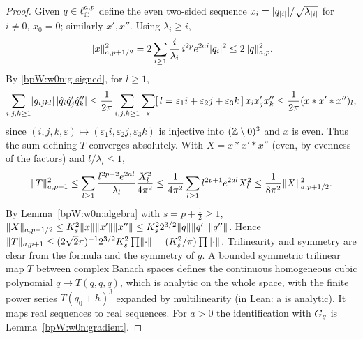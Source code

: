 \begin{proof}
\label{stepW:w0n:majorant}
Given $q\in\ell^{a,p}_{\mathbb{C}}$ define the even two-sided sequence $x_i=\lvert q_{\lvert i\rvert}\rvert/\sqrt{\lambda_{\lvert i\rvert}}$ for
$i\neq0$, $x_0=0$; similarly $x',x''$. Using $\lambda_i\ge i$,
\[\lVert x\rVert_{a,p+1/2}^2=2\sum_{i\ge1}\frac{i}{\lambda_i}\,i^{2p}e^{2ai}\lvert q_i\rvert^2\le2\lVert q\rVert_{a,p}^2.\]
\label{stepW:w0n:selection}
By \eqref{bpW:w0n:g-signed}, for $l\ge1$,
\[\sum_{i,j,k\ge1}\lvert g_{ijkl}\rvert\,\lvert \hat q_i\hat q'_j\hat q''_k\rvert\le\frac1{2\pi}\sum_{i,j,k\ge1}\sum_{\varepsilon}
[\,l=\varepsilon_1i+\varepsilon_2j+\varepsilon_3k\,]\,x_ix'_jx''_k\le\frac{1}{2\pi}(x*x'*x'')_l,\]
since $(i,j,k,\varepsilon)\mapsto(\varepsilon_1i,\varepsilon_2j,\varepsilon_3k)$ is injective into $(\mathbb{Z}\setminus0)^3$
and $x$ is even. Thus the sum defining $T$ converges absolutely.
\label{stepW:w0n:smoothing}
With $X=x*x'*x''$ (even, by evenness of the factors) and $l/\lambda_l\le1$,
\[\lVert T\rVert_{a,p+1}^2\le\sum_{l\ge1}\frac{l^{2p+2}e^{2al}}{\lambda_l}\frac{X_l^2}{4\pi^2}
\le\frac1{4\pi^2}\sum_{l\ge1}l^{2p+1}e^{2al}X_l^2\le\frac{1}{8\pi^2}\lVert X\rVert_{a,p+1/2}^2.\]
By Lemma~\ref{bpW:w0n:algebra} with $s=p+\frac12\ge1$, $\lVert X\rVert_{a,p+1/2}\le K_s^2\lVert x\rVert\lVert x'\rVert\lVert x''\rVert\le
K_s^22^{3/2}\lVert q\rVert\lVert q'\rVert\lVert q''\rVert$. Hence $\lVert T\rVert_{a,p+1}\le(2\sqrt2\pi)^{-1}2^{3/2}K_s^2\prod\lVert \cdot\rVert=
(K_s^2/\pi)\prod\lVert \cdot\rVert$.
\label{stepW:w0n:analytic}
Trilinearity and symmetry are clear from the formula and the symmetry of $g$. A bounded symmetric trilinear map
$T$ between complex Banach spaces defines the continuous homogeneous cubic polynomial $q\mapsto T(q,q,q)$, which
is analytic on the whole space, with the finite power series $T(q_0+h)^{3}$ expanded by multilinearity (in Lean:
a  is analytic). It maps real sequences to real sequences. For $a>0$ the identification
with $G_q$ is Lemma~\ref{bpW:w0n:gradient}.
\end{proof}

